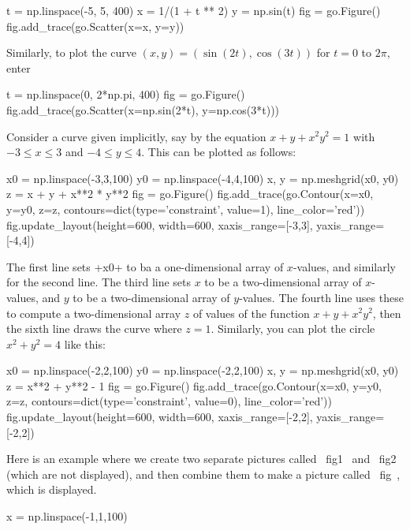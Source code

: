 \documentclass[a4paper,10pt]{amsbook}
\begin{document}
\begin{secenum}
  \begin{pcodeblock}
   t = np.linspace(-5, 5, 400)
   x = 1/(1 + t ** 2)
   y = np.sin(t)
   fig = go.Figure()
   fig.add_trace(go.Scatter(x=x, y=y))
  \end{pcodeblock}
  Similarly, to plot the curve $(x,y)=(\sin(2t),\cos(3t))$
  for $t=0$ to $2\pi$, enter
  \begin{pcodeblock}
   t = np.linspace(0, 2*np.pi, 400)
   fig = go.Figure()
   fig.add_trace(go.Scatter(x=np.sin(2*t), y=np.cos(3*t)))
  \end{pcodeblock}
 \item\label{implicitplot} Consider a curve given implicitly, say
  by the equation $x+y+x^2y^2=1$ with $-3\leq x\leq 3$ and
  $-4\leq y\leq 4$.  This can be plotted as follows:
  \begin{pcodeblock}
   x0 = np.linspace(-3,3,100)
   y0 = np.linspace(-4,4,100)
   x, y = np.meshgrid(x0, y0)
   z = x + y + x**2 * y**2
   fig = go.Figure()
   fig.add_trace(go.Contour(x=x0, y=y0, z=z, 
                            contours=dict(type='constraint', value=1), 
                            line_color='red'))
   fig.update_layout(height=600, width=600, xaxis_range=[-3,3], yaxis_range=[-4,4])
  \end{pcodeblock}
  The first line sets \pcode+x0+ to ba a one-dimensional array of
  $x$-values, and similarly for the second line.  The third line sets
  $x$ to be a two-dimensional array of $x$-values, and $y$ to be a
  two-dimensional array of $y$-values.  The fourth line uses these to
  compute a two-dimensional array $z$ of values of the function
  $x+y+x^2y^2$, then the sixth line draws the curve where $z=1$.
  Similarly, you can plot the circle $x^2+y^2=4$ like this:
  \begin{pcodeblock}
   x0 = np.linspace(-2,2,100)
   y0 = np.linspace(-2,2,100)
   x, y = np.meshgrid(x0, y0)
   z = x**2 + y**2 - 1
   fig = go.Figure()
   fig.add_trace(go.Contour(x=x0, y=y0, z=z, 
                            contours=dict(type='constraint', value=0), 
                            line_color='red'))
   fig.update_layout(height=600, width=600, xaxis_range=[-2,2], yaxis_range=[-2,2])
  \end{pcodeblock}
%
 \item\label{saveplot} 
  Here is an example where we create two separate pictures called
  \pcode~fig1~ and \pcode~fig2~ (which are not displayed), and then combine them
  to make a picture called \pcode~fig~, which is displayed. 
  \begin{pcodeblock}
    x = np.linspace(-1,1,100)

\end{pcodeblock}
\end{secenum}
\end{document}
